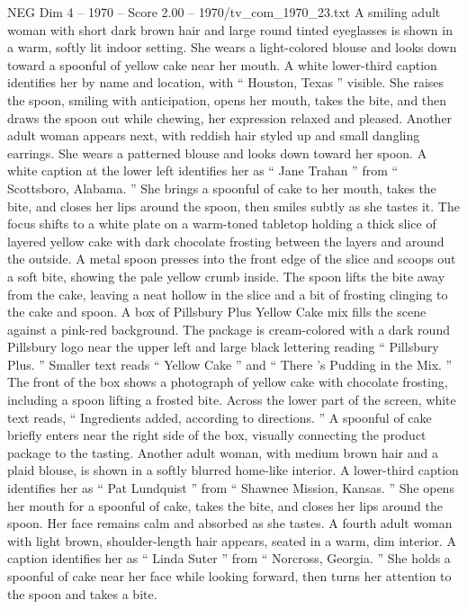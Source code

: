 \begin{textsample}{NEG Dim 4 – 1970 – Score 2.00 – 1970/tv\_com\_1970\_23.txt}  \label{ex:f4_neg_019}
A smiling adult woman with short dark brown hair and large round tinted eyeglasses is shown in a warm, softly lit indoor setting.
She wears a light-colored blouse and looks down toward a spoonful of yellow cake near her mouth.
A white lower-third caption identifies her by name and location, with “ Houston, Texas ” visible.
She raises the spoon, smiling with anticipation, opens her mouth, takes the bite, and then draws the spoon out while chewing, her expression relaxed and pleased.
Another adult woman appears next, with reddish hair styled up and small dangling earrings.
She wears a patterned blouse and looks down toward her spoon.
A white caption at the lower left identifies her as “ Jane Trahan ” from “ Scottsboro, Alabama. ” She brings a spoonful of cake to her mouth, takes the bite, and closes her lips around the spoon, then smiles subtly as she tastes it.
The focus shifts to a white plate on a warm-toned tabletop holding a thick slice of layered yellow cake with dark chocolate frosting between the layers and around the outside.
A metal spoon presses into the front edge of the slice and scoops out a soft bite, showing the pale yellow crumb inside.
The spoon lifts the bite away from the cake, leaving a neat hollow in the slice and a bit of frosting clinging to the cake and spoon.
A box of Pillsbury Plus Yellow Cake mix fills the scene against a pink-red background.
The package is cream-colored with a dark round Pillsbury logo near the upper left and large black lettering reading “ Pillsbury Plus. ” Smaller text reads “ Yellow Cake ” and “ There ’s Pudding in the Mix. ” The front of the box shows a photograph of yellow cake with chocolate frosting, including a spoon lifting a frosted bite.
Across the lower part of the screen, white text reads, “ Ingredients added, according to directions. ” A spoonful of cake briefly enters near the right side of the box, visually connecting the product package to the tasting.
Another adult woman, with medium brown hair and a plaid blouse, is shown in a softly blurred home-like interior.
A lower-third caption identifies her as “ Pat Lundquist ” from “ Shawnee Mission, Kansas. ” She opens her mouth for a spoonful of cake, takes the bite, and closes her lips around the spoon.
Her face remains calm and absorbed as she tastes.
A fourth adult woman with light brown, shoulder-length hair appears, seated in a warm, dim interior.
A caption identifies her as “ Linda Suter ” from “ Norcross, Georgia. ” She holds a spoonful of cake near her face while looking forward, then turns her attention to the spoon and takes a bite.

\end{textsample}
